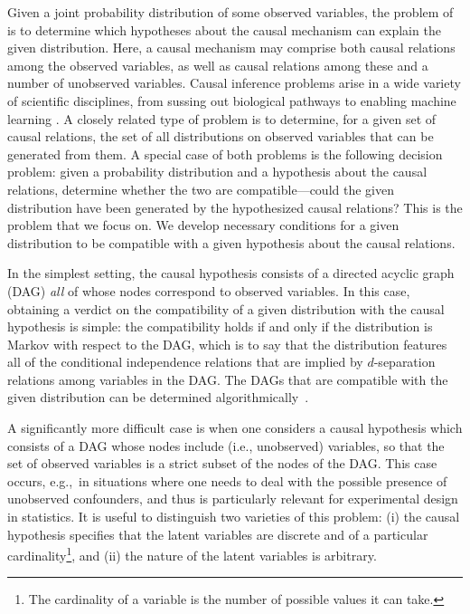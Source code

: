 \documentclass[aps,english,superscriptaddress,onecolumn,twoside,longbibliography,pra,floatfix,fleqn,nofootinbib]{revtex4-1}%
\newcommand*{\tblue}[1]{{\color{MidnightBlue}{\textbf{#1}}}}
\theoremstyle{definition}
\begin{document}
Given a joint probability distribution of some observed variables, the problem of \tblue{causal inference} is to determine which hypotheses about the causal mechanism can explain the given distribution. Here, a causal mechanism may comprise both causal relations among the observed variables, as well as causal relations among these and a number of unobserved variables.
 Causal inference problems arise in a wide variety of scientific disciplines, from sussing out biological pathways to enabling machine learning \cite{pearl2009causality,spirtes2011causation,studeny2005probabilistic,koller2009probabilistic}. A closely related type of problem is to determine, for a given set of causal relations, the set of all distributions on observed variables that can be generated from them.   
A special case of both problems is the following decision problem: given a probability distribution and a hypothesis about the causal relations, determine whether the two are compatible---could the given distribution have been generated by the hypothesized causal relations? This is the problem that we focus on.
We develop necessary conditions for a given distribution to be compatible with a given hypothesis about the causal relations.

In the simplest setting, the causal hypothesis consists of a directed acyclic graph (DAG) {\em all} of whose nodes correspond to observed variables. In this case, obtaining a verdict on the compatibility of a given distribution with the causal hypothesis is simple: the compatibility holds if and only if the distribution is Markov with respect to the DAG, which is to say that the distribution features all of the conditional independence relations that are implied by $d$-separation relations among variables in the DAG. 
The DAGs that are compatible with the given distribution can be determined algorithmically~\cite{pearl2009causality}.

A significantly more difficult case is when one considers a causal hypothesis which consists of a DAG whose nodes include \tblue{latent} (i.e., unobserved) variables, so that the set of observed variables is a strict subset of the nodes of the DAG. This case occurs, e.g.,~in situations where one needs to deal with the possible presence of unobserved confounders, and thus is particularly relevant for experimental design in statistics. It is useful to distinguish two varieties of this problem: (i) the causal hypothesis specifies that the latent variables are discrete and of a particular cardinality\footnote{The cardinality of a variable is the number of possible values it can take.}, and (ii) the nature of the latent variables is arbitrary.  
\end{document}
